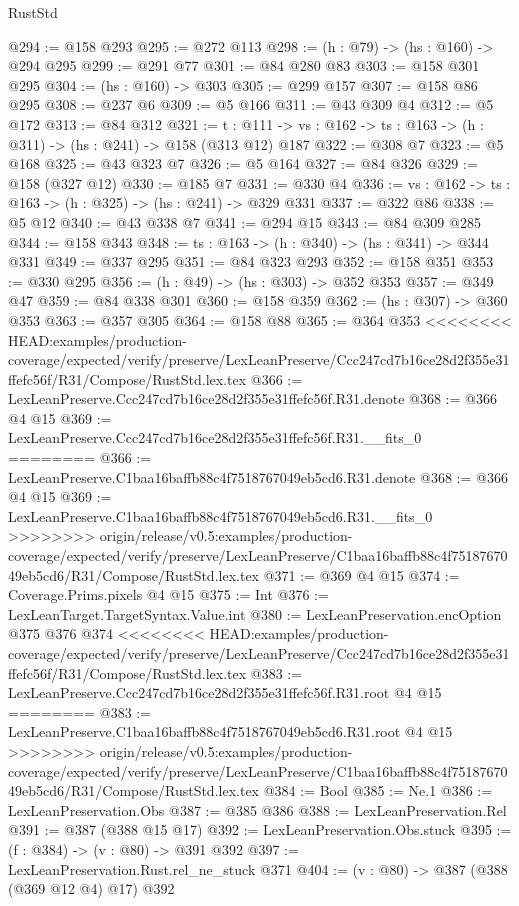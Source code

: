 \begin{lexlean}{RustStd}
\begin{coremodule}
{\begin{coremodule}
@294 := @158 @293
@295 := @272 @113
@298 := (h : @79) -> (hs : @160) -> @294 @295
@299 := @291 @77
@301 := @84 @280 @83
@303 := @158 @301 @295
@304 := (hs : @160) -> @303
@305 := @299 @157
@307 := @158 @86 @295
@308 := @237 @6
@309 := @5 @166
@311 := @43 @309 @4
@312 := @5 @172
@313 := @84 @312
@321 := {t : @111} ->
  {vs : @162} -> {ts : @163} -> (h : @311) -> (hs : @241) -> @158 (@313 @12) @187
@322 := @308 @7
@323 := @5 @168
@325 := @43 @323 @7
@326 := @5 @164
@327 := @84 @326
@329 := @158 (@327 @12)
@330 := @185 @7
@331 := @330 @4
@336 := {vs : @162} -> {ts : @163} -> (h : @325) -> (hs : @241) -> @329 @331
@337 := @322 @86
@338 := @5 @12
@340 := @43 @338 @7
@341 := @294 @15
@343 := @84 @309 @285
@344 := @158 @343
@348 := {ts : @163} -> (h : @340) -> (hs : @341) -> @344 @331
@349 := @337 @295
@351 := @84 @323 @293
@352 := @158 @351
@353 := @330 @295
@356 := (h : @49) -> (hs : @303) -> @352 @353
@357 := @349 @47
@359 := @84 @338 @301
@360 := @158 @359
@362 := (hs : @307) -> @360 @353
@363 := @357 @305
@364 := @158 @88
@365 := @364 @353
<<<<<<<< HEAD:examples/production-coverage/expected/verify/preserve/LexLeanPreserve/Ccc247cd7b16ce28d2f355e31ffefc56f/R31/Compose/RustStd.lex.tex
@366 := LexLeanPreserve.Ccc247cd7b16ce28d2f355e31ffefc56f.R31.denote
@368 := @366 @4 @15
@369 := LexLeanPreserve.Ccc247cd7b16ce28d2f355e31ffefc56f.R31.__fits_0
========
@366 := LexLeanPreserve.C1baa16baffb88c4f7518767049eb5cd6.R31.denote
@368 := @366 @4 @15
@369 := LexLeanPreserve.C1baa16baffb88c4f7518767049eb5cd6.R31.__fits_0
>>>>>>>> origin/release/v0.5:examples/production-coverage/expected/verify/preserve/LexLeanPreserve/C1baa16baffb88c4f7518767049eb5cd6/R31/Compose/RustStd.lex.tex
@371 := @369 @4 @15
@374 := Coverage.Prims.pixels @4 @15
@375 := Int
@376 := LexLeanTarget.TargetSyntax.Value.int
@380 := LexLeanPreservation.encOption @375 @376 @374
<<<<<<<< HEAD:examples/production-coverage/expected/verify/preserve/LexLeanPreserve/Ccc247cd7b16ce28d2f355e31ffefc56f/R31/Compose/RustStd.lex.tex
@383 := LexLeanPreserve.Ccc247cd7b16ce28d2f355e31ffefc56f.R31.root @4 @15
========
@383 := LexLeanPreserve.C1baa16baffb88c4f7518767049eb5cd6.R31.root @4 @15
>>>>>>>> origin/release/v0.5:examples/production-coverage/expected/verify/preserve/LexLeanPreserve/C1baa16baffb88c4f7518767049eb5cd6/R31/Compose/RustStd.lex.tex
@384 := Bool
@385 := Ne.{1}
@386 := LexLeanPreservation.Obs
@387 := @385 @386
@388 := LexLeanPreservation.Rel
@391 := @387 (@388 @15 @17)
@392 := LexLeanPreservation.Obs.stuck
@395 := (f : @384) -> (v : @80) -> @391 @392
@397 := LexLeanPreservation.Rust.rel_ne_stuck @371
@404 := (v : @80) -> @387 (@388 (@369 @12 @4) @17) @392

\end{coremodule}}
\end{coremodule}
\end{lexlean}
